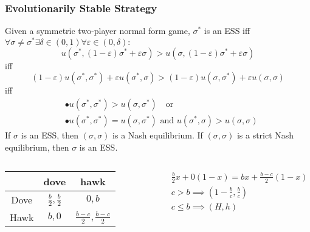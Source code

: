 \documentclass[UTF8,aspectratio=43,11pt,colorlinks,compress,openany]{beamer}%
\begin{document}
\begin{frame}\frametitle{Evolutionarily Stable Strategy}
Given a symmetric two-player normal form game, $\sigma^*$ is an ESS iff $\forall \sigma\neq \sigma^*\exists\delta\in(0,1)\forall\varepsilon\in(0,\delta):$
	\[u\left(\sigma^*,(1-\varepsilon)\sigma^*+\varepsilon \sigma\right)>u\left(\sigma,(1-\varepsilon)\sigma^*+\varepsilon \sigma\right)\]
	iff
	\[(1-\varepsilon)u\left(\sigma^*,\sigma^*\right)+\varepsilon u\left(\sigma^*,\sigma\right)>(1-\varepsilon)u\left(\sigma,\sigma^*\right)+\varepsilon u\left(\sigma,\sigma\right)\]
	iff
	\begin{align*}
	&\bullet u\left(\sigma^*,\sigma^*\right)>u\left(\sigma,\sigma^*\right)\quad\mbox{or}\\
	&\bullet u\left(\sigma^*,\sigma^*\right)=u\left(\sigma,\sigma^*\right)\mbox{ and } u\left(\sigma^*,\sigma\right)>u\left(\sigma,\sigma\right)
	\end{align*}
	If $\sigma$ is an ESS, then $(\sigma,\sigma)$ is a Nash equilibrium. If $(\sigma,\sigma)$ is a strict Nash equilibrium, then $\sigma$ is an ESS.
\begin{columns}
\begin{table}
\begin{tabu}{c|cc}
\hline
 & dove & hawk\\
\hline
Dove & $\frac{b}{2},\frac{b}{2}$ & $0,b$\\
Hawk & $b,0$ & $\frac{b-c}{2},\frac{b-c}{2}$\\
\hline
\end{tabu}
\end{table}
\vspace{-3ex}
\begin{align*}
&\frac{b}{2}x+0(1-x)=bx+\frac{b-c}{2}(1-x)\\
&c>b\implies(1-\frac{b}{c},\frac{b}{c})\\
&c\leq b\implies(H,h)
\end{align*}
\end{columns}
\end{frame}
\end{document}
